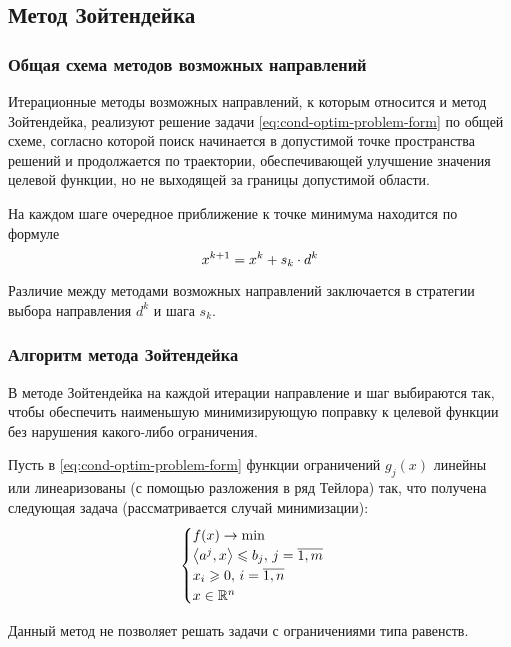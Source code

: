 
\subsection{Метод Зойтендейка}
\label{sec:zoutendijk}

\subsubsection{Общая схема методов возможных направлений}

Итерационные методы возможных направлений, к которым относится и метод
Зойтендейка, реализуют решение задачи
\eqref{eq:cond-optim-problem-form} по общей схеме, согласно которой
поиск начинается в допустимой точке пространства решений и
продолжается по траектории, обеспечивающей улучшение значения целевой
функции, но не выходящей за границы допустимой области.

На каждом шаге очередное приближение к точке минимума находится по
формуле
\begin{equation}
  \label{eq:pd-iter}
  x^{k+1} = x^k + s_k \cdot d^k
\end{equation}

Различие между методами возможных направлений заключается в стратегии
выбора направления $d^k$ и шага $s_k$.

\subsubsection{Алгоритм метода Зойтендейка}

В методе Зойтендейка на каждой итерации направление и шаг выбираются
так, чтобы обеспечить наименьшую минимизирующую поправку к целевой
функции без нарушения какого-либо ограничения.

Пусть в \eqref{eq:cond-optim-problem-form} функции ограничений
$g_j(x)$ линейны или линеаризованы (с помощью разложения в ряд
Тейлора) так, что получена следующая задача (рассматривается случай
минимизации):
\begin{equation}
  \label{eq:zoutendijk-problem-form}
  \begin{cases}
    f(x) \to \min \\
    {\left \langle a^j,x \right \rangle} \leqslant b_j,\, j=\overline{1,m} \\
    x_i \geqslant 0,\, i=\overline{1,n} \\
    x \in \mathbb{R}^n
  \end{cases}
\end{equation}

Данный метод не позволяет решать задачи с ограничениями типа равенств.

